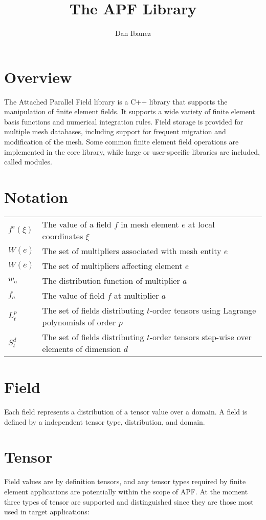 \documentclass{article}
\title{The APF Library}
\author{Dan Ibanez}
\date{}
\begin{document}
\maketitle

\section{Overview}
The Attached Parallel Field library is a C++ library that supports
the manipulation of finite element fields.
It supports a wide variety of finite element basis functions and
numerical integration rules.
Field storage is provided for multiple mesh databases, including
support for frequent migration and modification of the mesh.
Some common finite element field operations are implemented
in the core library, while large or user-specific libraries
are included, called modules.

\section{Notation}
\begin{tabular}{ll}
$f^e(\xi)$ & The value of a field $f$ in mesh element $e$ at local
coordinates $\xi$\\
$W(e)$ & The set of multipliers associated with mesh entity $e$\\
$W(\bar{e})$ & The set of multipliers affecting element $e$\\
$w_a$ & The distribution function of multiplier $a$\\
$f_a$ & The value of field $f$ at multiplier $a$\\
$L^p_t$ & The set of fields distributing $t$-order tensors
using Lagrange polynomials of order $p$\\
$S^d_t$ & The set of fields distributing $t$-order tensors
step-wise over elements of dimension $d$\\
\end{tabular}

\section{Field}
Each field represents a distribution of a tensor value over a domain.
A field is defined by a independent tensor type, distribution, and domain.

\section{Tensor}
Field values are by definition tensors, and any tensor types
required by finite element applications are potentially within
the scope of APF.
At the moment three types of tensor are supported and distinguished since
they are those most used in target applications:
\end{document}
